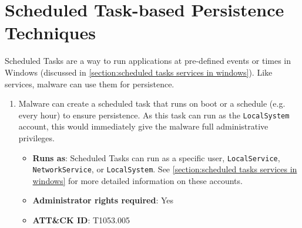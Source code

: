 \section{Scheduled Task-based Persistence Techniques}\label{section:scheduled task-based persistence}
Scheduled Tasks are a way to run applications at pre-defined events or times in Windows (discussed in \autoref{section:scheduled tasks services in windows}). Like services, malware can use them for persistence.

\begin{enumerate}[label={\textbf{TP\arabic*}:}, ref=TP\arabic*, start=0]
    \item \label{TP0} Malware can create a scheduled task that runs on boot or a schedule (e.g. every hour) to ensure persistence. As this task can run as the \texttt{LocalSystem} account, this would immediately give the malware full administrative privileges.

    \begin{itemize}[label={}, leftmargin=*]
        \item \textbf{Runs as}: Scheduled Tasks can run as a specific user, \texttt{LocalService}, \texttt{NetworkService}, or \texttt{LocalSystem}. See \autoref{section:scheduled tasks services in windows} for more detailed information on these accounts.

        \item \textbf{Administrator rights required}: Yes

        \item \textbf{ATT\&CK ID}: T1053.005
    \end{itemize}
\end{enumerate}
